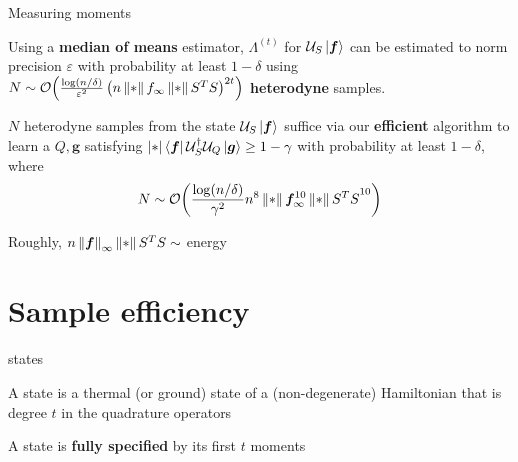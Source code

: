 \begin{frame}{Measuring moments}

  \begin{theorem}
    Using a \textbf{median of means} estimator,
    \(\Lambda^{(t)}\) for \(\calU_S\ket{\bm f}\) can be estimated to norm precision \(\varepsilon\) with probability at least \(1-\delta\) using
    \(N \sim \mathcal{O}\!\left(\frac{\log(n/\delta)}{\varepsilon^2} \left(n\left\lVert * \right\rVert{f}_\infty \left\lVert * \right\rVert{S^TS}\right)^{2t}\right)\) \textbf{heterodyne} samples.
  \end{theorem}

  \pause

  \vfill

  \begin{corollary}
    \(N\) heterodyne samples from the state \(\calU_S\ket{\bm f}\) suffice via our \textbf{efficient} algorithm to learn a \(Q,\bm g\) satisfying \(\abs*{\bra{\bm f}\calU_S^\dag \calU_Q \ket{\bm g}} \geq 1 - \gamma\) with probability at least \(1-\delta\), where
    \begin{equation*}
      N \sim \mathcal{O}\!\left(\frac{\log(n/\delta)}{\gamma^2} n^8 \left\lVert * \right\rVert{\bm f}_\infty^{10} \left\lVert * \right\rVert{S^TS}^{10}\right)
    \end{equation*}
  \end{corollary}

  \vfill

  Roughly, \(n \left\lVert \bm f \right\rVert_\infty \left\lVert * \right\rVert{S^TS} \sim \) energy


\end{frame}






\section{Sample efficiency}
\overviewslide[currentsection]


\begin{frame}{\Gt states}
  \begin{definition}
    A \Gt state is a thermal (or ground) state of a (non-degenerate) Hamiltonian that is degree \(t\) in the quadrature operators
  \end{definition}

  \vfill

  \begin{spaceditemize}
    \item A \Gt state is \textbf{fully specified} by its first \(t\) moments
  \end{spaceditemize}
\end{frame}


